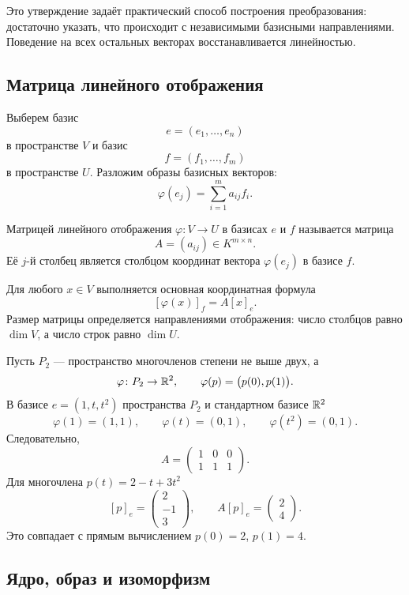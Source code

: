 Это утверждение задаёт практический способ построения преобразования: достаточно указать, что происходит с независимыми базисными направлениями. Поведение на всех остальных векторах восстанавливается линейностью.

\subsection{Матрица линейного отображения}

Выберем базис
\[
e=(e_1,\dots,e_n)
\]
в пространстве \(V\) и базис
\[
f=(f_1,\dots,f_m)
\]
в пространстве \(U\). Разложим образы базисных векторов:
\[
\varphi(e_j)
=
\sum_{i=1}^{m}a_{ij}f_i.
\]

\begin{definition}
Матрицей линейного отображения \(\varphi\colon V\to U\) в базисах
\(e\) и \(f\) называется матрица
\[
A=(a_{ij})\in K^{m\times n}.
\]
Её \(j\)-й столбец является столбцом координат вектора
\(\varphi(e_j)\) в базисе \(f\).
\end{definition}

Для любого \(x\in V\) выполняется основная координатная формула
\[
[\varphi(x)]_f
=
A[x]_e.
\]
Размер матрицы определяется направлениями отображения:
число столбцов равно \(\dim V\), а число строк равно \(\dim U\).

\begin{example}
Пусть \(P_2\) --- пространство многочленов степени не выше двух,
а
\[
\varphi\colon P_2\to\mathbb{R}^2,
\qquad
\varphi(p)=\bigl(p(0),p(1)\bigr).
\]
В базисе \(e=(1,t,t^2)\) пространства \(P_2\) и стандартном базисе
\(\mathbb{R}^2\)
\[
\varphi(1)=(1,1),
\qquad
\varphi(t)=(0,1),
\qquad
\varphi(t^2)=(0,1).
\]
Следовательно,
\[
A=
\begin{pmatrix}
1&0&0\\
1&1&1
\end{pmatrix}.
\]
Для многочлена \(p(t)=2-t+3t^2\)
\[
[p]_e=
\begin{pmatrix}
2\\-1\\3
\end{pmatrix},
\qquad
A[p]_e
=
\begin{pmatrix}
2\\4
\end{pmatrix}.
\]
Это совпадает с прямым вычислением \(p(0)=2\), \(p(1)=4\).
\end{example}

\subsection{Ядро, образ и изоморфизм}

